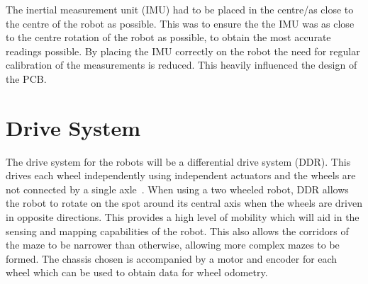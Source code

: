 The inertial measurement unit (IMU) had to be placed in the centre/as 
close to the centre of the robot as possible. This was to ensure the the 
IMU was as close to the centre rotation of the robot as possible, to 
obtain the most accurate readings possible. By placing the IMU correctly 
on the robot the need for regular calibration of the measurements is 
reduced. This heavily influenced the design of the PCB. 


\section{Drive System}\label{mech/drive}

The drive system for the robots will be a differential drive system (DDR).
This drives each wheel independently using independent actuators and the
wheels are not connected by a single axle~\cite[p.~146]{braunl_embedded_2013}.
When using a two wheeled robot, DDR allows the
robot to rotate on the spot around its central axis when the wheels 
are driven in opposite directions. This provides a high level of 
mobility which will aid in the sensing and mapping capabilities of 
the robot. This also allows the corridors of the maze to be narrower 
than otherwise, allowing more complex mazes to be formed. The 
chassis chosen is accompanied by a motor and encoder for each wheel 
which can be used to obtain data for wheel odometry. 
